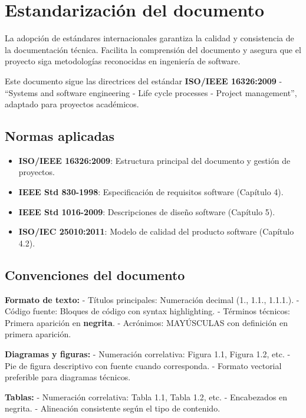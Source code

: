 \documentclass[12pt,a4paper,oneside]{report}
\providecommand{\tightlist}{%
  \setlength{\itemsep}{0pt}\setlength{\parskip}{0pt}}
\begin{document}
\section{Estandarización del
documento}\label{estandarizaciuxf3n-del-documento}

La adopción de estándares internacionales garantiza la calidad y consistencia de la documentación técnica. Facilita la comprensión del documento y asegura que el proyecto siga metodologías reconocidas en ingeniería de software.

Este documento sigue las directrices del estándar \textbf{ISO/IEEE 16326:2009} - ``Systems and software engineering - Life cycle processes - Project management'', adaptado para proyectos académicos.

\subsection{Normas aplicadas}\label{normas-aplicadas}

\begin{itemize}
\tightlist
\item
  \textbf{ISO/IEEE 16326:2009}: Estructura principal del documento y
  gestión de proyectos.
\item
  \textbf{IEEE Std 830-1998}: Especificación de requisitos software
  (Capítulo 4).
\item
  \textbf{IEEE Std 1016-2009}: Descripciones de diseño software
  (Capítulo 5).
\item
  \textbf{ISO/IEC 25010:2011}: Modelo de calidad del producto software
  (Capítulo 4.2).
\end{itemize}

\subsection{Convenciones del
documento}\label{convenciones-del-documento}

\textbf{Formato de texto:} - Títulos principales: Numeración decimal
(1., 1.1., 1.1.1.). - Código fuente: Bloques de código con syntax
highlighting. - Términos técnicos: Primera aparición en
\textbf{negrita}. - Acrónimos: MAYÚSCULAS con definición en primera
aparición.

\textbf{Diagramas y figuras:} - Numeración correlativa: Figura 1.1,
Figura 1.2, etc. - Pie de figura descriptivo con fuente cuando
corresponda. - Formato vectorial preferible para diagramas técnicos.

\textbf{Tablas:} - Numeración correlativa: Tabla 1.1, Tabla 1.2, etc. -
Encabezados en negrita. - Alineación consistente según el tipo de
contenido.
\end{document}
